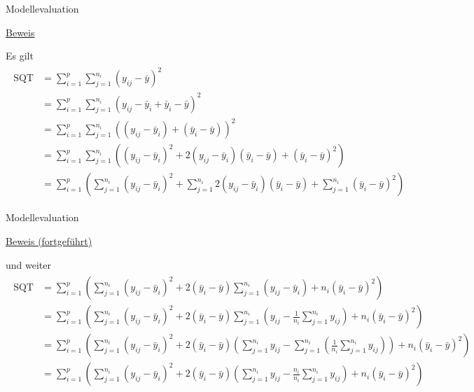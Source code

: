 \documentclass[
  8pt,
  ignorenonframetext,
]{beamer}
\begin{document}
\begin{frame}{Modellevaluation}
\protect\hypertarget{modellevaluation-2}{}
\footnotesize

\underline{Beweis}

Es gilt \tiny \begin{align}
\begin{split}
\mbox{SQT}
& = \sum_{i=1}^p \sum_{j=1}^{n_i}(y_{ij}-\bar{y})^{2}
\\
& = \sum_{i=1}^p \sum_{j=1}^{n_i} (y_{ij}-\bar{y}_i+\bar{y}_i-\bar{y})^2
\\
& = \sum_{i=1}^p \sum_{j=1}^{n_i} \left((y_{ij}-\bar{y}_i)+(\bar{y}_i-\bar{y}) \right)^2
\\
& = \sum_{i=1}^p \sum_{j=1}^{n_i} \left(
                                    (y_{ij}-\bar{y}_i)^2
                                  +2(y_{ij}-\bar{y}_i)(\bar{y}_i-\bar{y})
                                  +(\bar{y}_i-\bar{y})^2 \right)
\\
& = \sum_{i=1}^p \left(\sum_{j=1}^{n_i} (y_{ij}-\bar{y}_i)^2
                      +\sum_{j=1}^{n_i}  2(y_{ij}-\bar{y}_i)(\bar{y}_i-\bar{y})
                      +\sum_{j=1}^{n_i} (\bar{y}_i-\bar{y})^2 \right)
\end{split}
\end{align}
\end{frame}

\begin{frame}{Modellevaluation}
\protect\hypertarget{modellevaluation-3}{}
\footnotesize

\underline{Beweis (fortgeführt)}

und weiter \tiny \begin{align*}
\begin{split}
\mbox{SQT}
& = \sum_{i=1}^p \left(\sum_{j=1}^{n_i} (y_{ij}-\bar{y}_i)^2
                     +2(\bar{y}_i-\bar{y})\sum_{j=1}^{n_i}(y_{ij}-\bar{y}_i)
                       +n_i(\bar{y}_i-\bar{y})^2 \right)
\\
& =\sum_{i=1}^p \left(\sum_{j=1}^{n_i} (y_{ij}-\bar{y}_i)^2
                 +2(\bar{y}_i-\bar{y})\sum_{j=1}^{n_i} \left(y_{ij}-\frac{1}{n_i}\sum_{j=1}^{n_i}{y_{ij}}\right)
                 +n_i(\bar{y}_i-\bar{y})^2 \right)
\\
& =\sum_{i=1}^p \left(\sum_{j=1}^{n_i} (y_{ij}-\bar{y}_i)^2
                                       +2(\bar{y}_i-\bar{y})\left(\sum_{j=1}^{n_i} y_{ij}-\sum_{j=1}^{n_i}\left(\frac{1}{n_i}\sum_{j=1}^{n_i}{y_{ij}}\right)\right)
                                        +n_i(\bar{y}_i-\bar{y})^2 \right)
\\
& =\sum_{i=1}^p \left(\sum_{j=1}^{n_i} (y_{ij}-\bar{y}_i)^2
                                       +2(\bar{y}_i-\bar{y})\left(\sum_{j=1}^{n_i} y_{ij}-\frac{n_i}{n_i}\sum_{j=1}^{n_i}{y_{ij}}\right)
                                        +n_i(\bar{y}_i-\bar{y})^2 \right)
\end{split}
\end{align*}
\end{frame}
\end{document}
